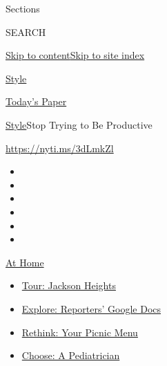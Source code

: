 Sections

SEARCH

\protect\hyperlink{site-content}{Skip to
content}\protect\hyperlink{site-index}{Skip to site index}

\href{https://www.nytimes3xbfgragh.onion/section/style}{Style}

\href{https://myaccount.nytimes3xbfgragh.onion/auth/login?response_type=cookie\&client_id=vi}{}

\href{https://www.nytimes3xbfgragh.onion/section/todayspaper}{Today's
Paper}

\href{/section/style}{Style}\textbar{}Stop Trying to Be Productive

\url{https://nyti.ms/3dLmkZl}

\begin{itemize}
\item
\item
\item
\item
\item
\item
\end{itemize}

\href{https://www.nytimes3xbfgragh.onion/spotlight/at-home?action=click\&pgtype=Article\&state=default\&region=TOP_BANNER\&context=at_home_menu}{At
Home}

\begin{itemize}
\tightlist
\item
  \href{https://www.nytimes3xbfgragh.onion/interactive/2020/08/27/arts/design/jackson-heights-queens-virtual-walk-tour.html?action=click\&pgtype=Article\&state=default\&region=TOP_BANNER\&context=at_home_menu}{Tour:
  Jackson Heights}
\item
  \href{https://www.nytimes3xbfgragh.onion/interactive/2020/at-home/even-more-reporters-editors-diaries-lists-recommendations.html?action=click\&pgtype=Article\&state=default\&region=TOP_BANNER\&context=at_home_menu}{Explore:
  Reporters' Google Docs}
\item
  \href{https://www.nytimes3xbfgragh.onion/2020/08/31/dining/hand-held-picnic-food.html?action=click\&pgtype=Article\&state=default\&region=TOP_BANNER\&context=at_home_menu}{Rethink:
  Your Picnic Menu}
\item
  \href{https://www.nytimes3xbfgragh.onion/article/choosing-a-pediatrician-children.html?action=click\&pgtype=Article\&state=default\&region=TOP_BANNER\&context=at_home_menu}{Choose:
  A Pediatrician}
\end{itemize}

